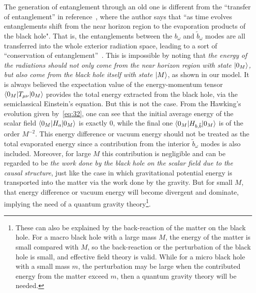 \documentclass[12pt,a4paper]{article}
\begin{document}
The generation of entanglement through an old one is different from
the ``transfer of entanglement'' in reference~\cite{g}, where the
author says that ``as time evolves entanglements shift from the
near horizon region to the evaporation products of the black hole".
That is, the entanglements between the $b_{\omega}$ and
$\tilde{b}_{\omega}$ modes are all transferred into the whole exterior
radiation space, leading to a sort of ``conservation of entanglement''~\cite{f}. This is impossible by noting that \emph{the
energy of the radiations should not only come from the near horizon region with state $\arrowvert0_M\rangle$, but also come
from the black hole itself with state $\arrowvert M\rangle$}, as shown in our model. It is always believed the expectation value of the energy-momentum tensor $\langle0_M\arrowvert T_{\mu\nu}\arrowvert0_M\rangle$ provides the total energy extracted from the black hole, via the semiclassical Einstein's equation. But this is not the case. From the Hawking's evolution given by~\eqref{eq:32}, one can see that the initial average energy of the scalar field $\langle0_M\arrowvert H_a\arrowvert0_M\rangle$ is exactly 0, while the final one $\langle0_M\arrowvert H_{b,\tilde{b}}\arrowvert0_M\rangle$ is of the order $M^{-2}$. This energy difference or vacuum energy should not be treated as the total evaporated energy since a contribution from the interior $\tilde{b}_{\omega}$ modes is also included. Moreover, for large $M$ this contribution is negligible and can be regarded to be \emph{the work done by the black hole on the scalar field due to the causal structure}, just like the case in which gravitational potential energy is transported into the matter via the work done by the gravity. But for small $M$, that energy difference or vacuum energy will become divergent and dominate, implying the need of a quantum gravity theory\footnote{These can also be explained by the back-reaction of the matter on the black hole. For a macro black hole with a large mass $M$, the energy of the matter is small compared with $M$, so the back-reaction or the perturbation of the black hole is small, and effective field theory is valid. While for a micro black hole with a small mass $m$, the perturbation may be large when the contributed energy from the matter exceed $m$, then a quantum gravity theory will be needed.}.
\end{document}
